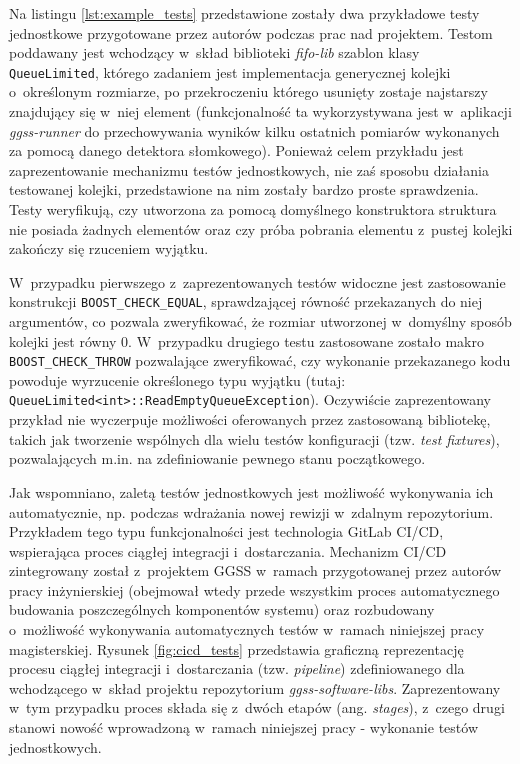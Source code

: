 Na listingu \ref{lst:example_tests} przedstawione zostały dwa przykładowe testy jednostkowe przygotowane przez autorów podczas prac nad projektem. Testom poddawany jest wchodzący w~skład biblioteki \emph{fifo-lib} szablon klasy \lstinline{QueueLimited}, którego zadaniem jest implementacja generycznej kolejki o~określonym rozmiarze, po przekroczeniu którego usunięty zostaje najstarszy znajdujący się w~niej element (funkcjonalność ta wykorzystywana jest w~aplikacji \emph{ggss-runner} do przechowywania wyników kilku ostatnich pomiarów wykonanych za pomocą danego detektora słomkowego). Ponieważ celem przykładu jest zaprezentowanie mechanizmu testów jednostkowych, nie zaś sposobu działania testowanej kolejki, przedstawione na nim zostały bardzo proste sprawdzenia. Testy weryfikują, czy utworzona za pomocą domyślnego konstruktora struktura nie posiada żadnych elementów oraz czy próba pobrania elementu z~pustej kolejki zakończy się rzuceniem wyjątku.



W~przypadku pierwszego z~zaprezentowanych testów widoczne jest zastosowanie konstrukcji \lstinline{BOOST_CHECK_EQUAL}, sprawdzającej równość przekazanych do niej argumentów, co pozwala zweryfikować, że rozmiar utworzonej w~domyślny sposób kolejki jest równy 0. W~przypadku drugiego testu zastosowane zostało makro \lstinline{BOOST_CHECK_THROW} pozwalające zweryfikować, czy wykonanie przekazanego kodu powoduje wyrzucenie określonego typu wyjątku (tutaj: \lstinline{QueueLimited<int>::ReadEmptyQueueException}). Oczywiście zaprezentowany przykład nie wyczerpuje możliwości oferowanych przez zastosowaną bibliotekę, takich jak tworzenie wspólnych dla wielu testów konfiguracji (tzw. \emph{test fixtures}), pozwalających m.in. na zdefiniowanie pewnego stanu początkowego.

Jak wspomniano, zaletą testów jednostkowych jest możliwość wykonywania ich automatycznie, np. podczas wdrażania nowej rewizji w~zdalnym repozytorium. Przykładem tego typu funkcjonalności jest technologia GitLab CI/CD, wspierająca proces ciągłej integracji i~dostarczania. Mechanizm CI/CD zintegrowany został z~projektem GGSS w~ramach przygotowanej przez autorów pracy inżynierskiej (obejmował wtedy przede wszystkim proces automatycznego budowania poszczególnych komponentów systemu) oraz rozbudowany o~możliwość wykonywania automatycznych testów w~ramach niniejszej pracy magisterskiej. Rysunek \ref{fig:cicd_tests} przedstawia graficzną reprezentację procesu ciągłej integracji i~dostarczania (tzw. \emph{pipeline}) zdefiniowanego dla wchodzącego w~skład projektu repozytorium \emph{ggss-software-libs}. Zaprezentowany w~tym przypadku proces składa się z~dwóch etapów (ang. \emph{stages}), z~czego drugi stanowi nowość wprowadzoną w~ramach niniejszej pracy - wykonanie testów jednostkowych. 

